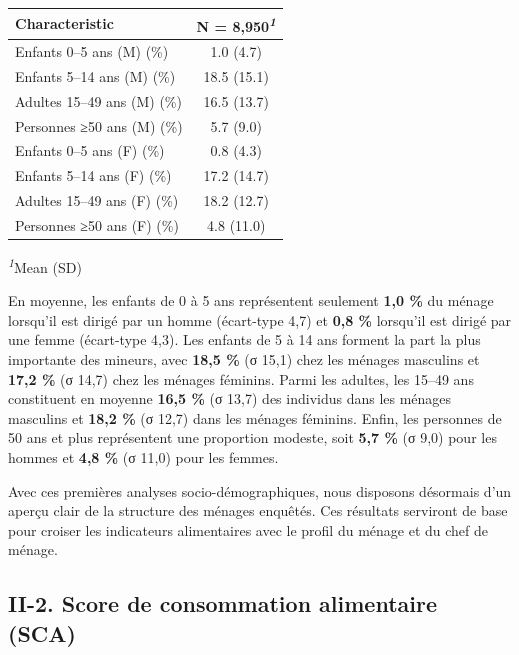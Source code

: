 \documentclass[
]{article}
\begin{document}
\begin{table}[!t]
\fontsize{9.8pt}{11.7pt}\selectfont
\begin{tabular*}{\linewidth}{@{\extracolsep{\fill}}lc}
\toprule
\textbf{Characteristic} & \textbf{N = 8,950}\textsuperscript{\textit{1}} \\ 
\midrule\addlinespace[2.5pt]
Enfants 0–5 ans (M) (\%) & 1.0 (4.7) \\ 
Enfants 5–14 ans (M) (\%) & 18.5 (15.1) \\ 
Adultes 15–49 ans (M) (\%) & 16.5 (13.7) \\ 
Personnes ≥50 ans (M) (\%) & 5.7 (9.0) \\ 
Enfants 0–5 ans (F) (\%) & 0.8 (4.3) \\ 
Enfants 5–14 ans (F) (\%) & 17.2 (14.7) \\ 
Adultes 15–49 ans (F) (\%) & 18.2 (12.7) \\ 
Personnes ≥50 ans (F) (\%) & 4.8 (11.0) \\ 
\bottomrule
\end{tabular*}
\begin{minipage}{\linewidth}
\textsuperscript{\textit{1}}Mean (SD)\\
\end{minipage}
\end{table}

En moyenne, les enfants de 0 à 5 ans représentent seulement \textbf{1,0
\%} du ménage lorsqu'il est dirigé par un homme (écart-type 4,7) et
\textbf{0,8 \%} lorsqu'il est dirigé par une femme (écart-type 4,3). Les
enfants de 5 à 14 ans forment la part la plus importante des mineurs,
avec \textbf{18,5 \%} (σ 15,1) chez les ménages masculins et
\textbf{17,2 \%} (σ 14,7) chez les ménages féminins. Parmi les adultes,
les 15--49 ans constituent en moyenne \textbf{16,5 \%} (σ 13,7) des
individus dans les ménages masculins et \textbf{18,2 \%} (σ 12,7) dans
les ménages féminins. Enfin, les personnes de 50 ans et plus
représentent une proportion modeste, soit \textbf{5,7 \%} (σ 9,0) pour
les hommes et \textbf{4,8 \%} (σ 11,0) pour les femmes.

Avec ces premières analyses socio-démographiques, nous disposons
désormais d'un aperçu clair de la structure des ménages enquêtés. Ces
résultats serviront de base pour croiser les indicateurs alimentaires
avec le profil du ménage et du chef de ménage.

\hypertarget{ii-2.-score-de-consommation-alimentaire-sca}{%
\subsection{II-2. Score de consommation alimentaire
(SCA)}\label{ii-2.-score-de-consommation-alimentaire-sca}}
\end{document}
